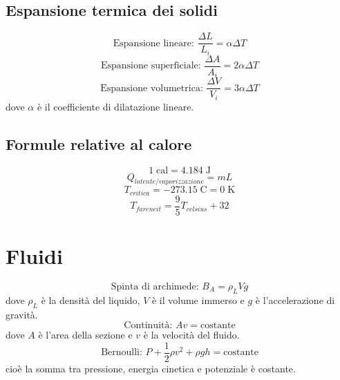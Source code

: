 \documentclass[a4paper]{article}
\theoremstyle{break}
\theoremstyle{break}
\theoremstyle{break}
\theoremstyle{break}
\begin{document}
\subsection{Espansione termica dei solidi}
\[
\text{Espansione lineare: } \frac{\Delta L}{L_i} = \alpha \Delta T
\] 
\[
\text{Espansione superficiale: } \frac{\Delta A}{A_i} = 2 \alpha \Delta T
\] 
\[
\text{Espansione volumetrica: } \frac{\Delta V}{V_i} = 3 \alpha \Delta T
\] 
dove \( \alpha \) è il coefficiente di dilatazione lineare.

\subsection{Formule relative al calore}
\[
1\; \text{cal} = 4.184\; \text{J}
\] 
\[
  Q_{latente/vaporizzazione} = mL
\] 
\[
  T_{critica} = -273.15\; \text{C} = 0\; \text{K}
\] 
\[
  T_{fareneit} = \frac{9}{5} T_{celsius} + 32
\] 

\section{Fluidi}
\[
  \text{Spinta di archimede: } B_{A} = \rho_L V g
\] 
dove \( \rho_L \) è la densità del liquido, \( V \) è il volume immerso e \( g \) è l'accelerazione di gravità.
\[
\text{Continuità: } A v = \text{costante}
\] 
dove \( A \) è l'area della sezione e \( v \) è la velocità del fluido.
\[
\text{Bernoulli: } P + \frac{1}{2} \rho v^2 + \rho g h = \text{costante}
\] 
cioè la somma tra pressione, energia cinetica e potenziale è costante.
\end{document}
